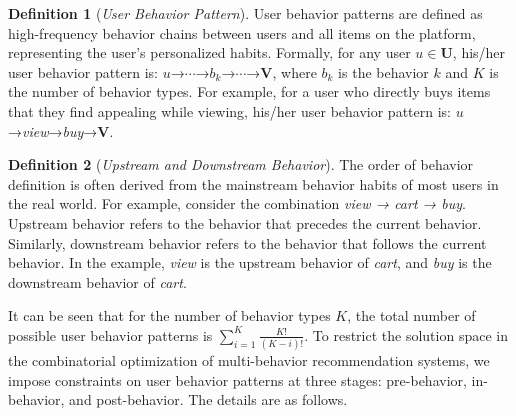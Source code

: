 \textbf{Definition 1} (\textit{User Behavior Pattern}). User behavior patterns are defined as high-frequency behavior chains between users and all items on the platform, representing the user's personalized habits. Formally, for any user $u \in \mathbf{U}$, his/her user behavior pattern is: $u$→$\cdots$→$b_k$→$\cdots$→$\mathbf{V}$, where $b_k$ is the behavior $k$ and $K$ is the number of behavior types. For example, for a user who directly buys items that they find appealing while viewing, his/her user behavior pattern is: $u$→\textit{view}→\textit{buy}→$\mathbf{V}$.


\textbf{Definition 2} (\textit{Upstream and Downstream Behavior}). 
The order of behavior definition is often derived from the mainstream behavior habits of most users in the real world. For example, consider the combination \textit{view → cart → buy}. Upstream behavior refers to the behavior that precedes the current behavior. Similarly, downstream behavior refers to the behavior that follows the current behavior. In the example, \textit{view} is the upstream behavior of \textit{cart}, and \textit{buy} is the downstream behavior of \textit{cart}.



It can be seen that for the number of behavior types $K$, the total number of possible user behavior patterns is $\sum_{i=1}^K\frac{K!}{(K-i)!}$. To restrict the solution space in the combinatorial optimization of multi-behavior recommendation systems, we impose constraints on user behavior patterns at three stages: pre-behavior, in-behavior, and post-behavior. The details are as follows.

